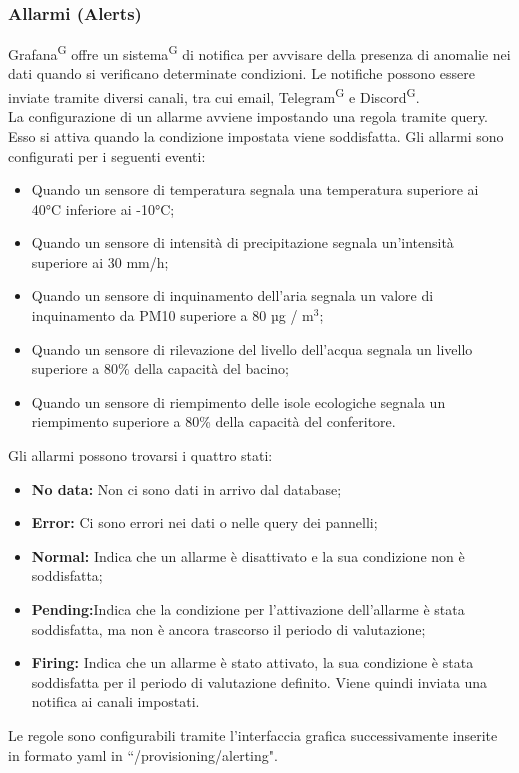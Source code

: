 \documentclass[8pt]{article}
\newcommand{\glossterm}[1]{#1\textsuperscript{G}} %
\begin{document}
\subsubsection{Allarmi (Alerts)}
\glossterm{Grafana} offre un \glossterm{sistema} di notifica per avvisare della presenza di anomalie nei dati quando si verificano determinate condizioni. Le notifiche possono essere inviate tramite diversi canali, tra cui email, \glossterm{Telegram} e \glossterm{Discord}.
\\La configurazione di un allarme avviene impostando una regola tramite query. Esso si attiva quando la condizione impostata viene soddisfatta. Gli allarmi sono configurati per i seguenti eventi:
\begin{itemize}
	\setlength\itemsep{0em}
    \item Quando un sensore di temperatura segnala una temperatura superiore ai 40°C  inferiore ai -10°C;
    \item Quando un sensore di intensità di precipitazione segnala un'intensità superiore ai 30 mm/h;
    \item Quando un sensore di inquinamento dell'aria segnala un valore di inquinamento da PM10 superiore a 80 µg / $\mbox{m}^{\mbox{3}}$;
    \item Quando un sensore di rilevazione del livello dell'acqua segnala un livello superiore a 80\% della capacità del bacino;
    \item Quando un sensore di riempimento delle isole ecologiche segnala un riempimento superiore a 80\% della capacità del conferitore.
\end{itemize}
Gli allarmi possono trovarsi i quattro stati:
\begin{itemize}
	\setlength\itemsep{0em}
    \item \textbf{No data:} Non ci sono dati in arrivo dal database;
    \item \textbf{Error:} Ci sono errori nei dati o nelle query dei pannelli;
    \item \textbf{Normal:} Indica che un allarme è disattivato e la sua condizione non è soddisfatta;
    \item \textbf{Pending:}Indica che la condizione per l’attivazione dell’allarme è stata soddisfatta, ma non è ancora trascorso il periodo di valutazione;
    \item \textbf{Firing:} Indica che un allarme è stato attivato, la sua condizione è stata soddisfatta per il periodo di valutazione definito. Viene quindi inviata una notifica ai canali impostati.
\end{itemize}
Le regole sono configurabili tramite l’interfaccia grafica successivamente inserite in formato yaml in ``/provisioning/alerting".
\end{document}
